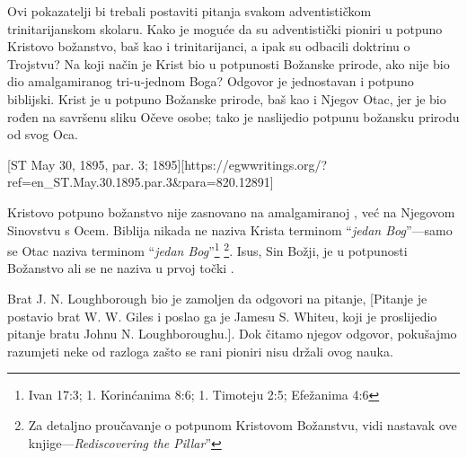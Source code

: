 Ovi pokazatelji bi trebali postaviti pitanja svakom adventističkom trinitarijanskom skolaru. Kako je moguće da su adventistički pioniri u potpuno Kristovo božanstvo, baš kao i trinitarijanci, a ipak su odbacili doktrinu o Trojstvu? Na koji način je Krist bio u potpunosti Božanske prirode, ako nije bio dio amalgamiranog tri-u-jednom Boga? Odgovor je jednostavan i potpuno biblijski. Krist je u potpuno Božanske prirode, baš kao i Njegov Otac, jer je bio rođen na savršenu sliku Očeve osobe; tako je naslijedio potpunu božansku prirodu od svog Oca.

[ST May 30, 1895, par. 3; 1895][https://egwwritings.org/?ref=en\_ST.May.30.1895.par.3&para=820.12891]

Kristovo potpuno božanstvo nije zasnovano na amalgamiranoj , već na Njegovom Sinovstvu s Ocem. Biblija nikada ne naziva Krista terminom “\textit{jedan Bog}”—samo se Otac naziva terminom “\textit{jedan Bog}”\footnote{Ivan 17:3; 1. Korinćanima 8:6; 1. Timoteju 2:5; Efežanima 4:6} \footnote{Za detaljno proučavanje o potpunom Kristovom Božanstvu, vidi nastavak ove knjige—\textit{Rediscovering the Pillar}”}. Isus, Sin Božji, je u potpunosti Božanstvo ali se ne naziva  u prvoj točki .


Brat J. N. Loughborough bio je zamoljen da odgovori na pitanje, [Pitanje je postavio brat W. W. Giles i poslao ga je Jamesu S. Whiteu, koji je proslijedio pitanje bratu Johnu N. Loughboroughu.]. Dok čitamo njegov odgovor, pokušajmo razumjeti neke od razloga zašto se rani pioniri nisu držali ovog nauka.


